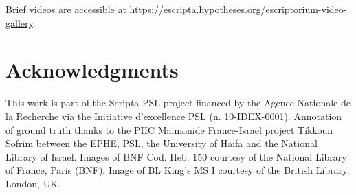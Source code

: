 Brief videos are accessible at
\url{https://escripta.hypotheses.org/escriptorium-video-gallery}.

\section*{Acknowledgments}

This work is part of the Scripta-PSL project financed by the Agence Nationale
de la Recherche via the Initiative d’excellence PSL (n. 10-IDEX-0001).
Annotation of ground truth thanks to the PHC Maimonide France-Israel project
Tikkoun Sofrim between the EPHE, PSL, the University of Haifa and the National
Library of Israel. Images of BNF Cod.  Heb. 150 courtesy of the National
Library of France, Paris (BNF). Image of BL King’s MS I courtesy of the British
Library, London, UK.
